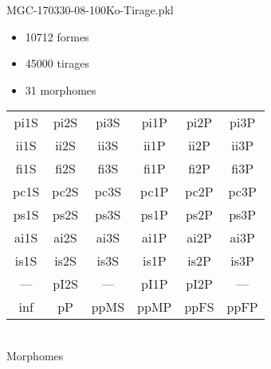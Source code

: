 MGC-170330-08-100Ko-Tirage.pkl
\begin{itemize}
\item 10712 formes
\item 45000 tirages
\item 31 morphomes
\end{itemize}
\begin{center}
\begin{tabular}{cccccc}
\hline
\cellcolor{white}pi1S & \cellcolor{orange}pi2S & \cellcolor{orange}pi3S & \cellcolor{white}pi1P & \cellcolor{white}pi2P & \cellcolor{white}pi3P\\
\cellcolor{brown}ii1S & \cellcolor{brown}ii2S & \cellcolor{brown}ii3S & \cellcolor{white}ii1P & \cellcolor{white}ii2P & \cellcolor{brown}ii3P\\
\cellcolor{yellow}fi1S & \cellcolor{lime}fi2S & \cellcolor{lime}fi3S & \cellcolor{green}fi1P & \cellcolor{white}fi2P & \cellcolor{green}fi3P\\
\cellcolor{yellow}pc1S & \cellcolor{yellow}pc2S & \cellcolor{yellow}pc3S & \cellcolor{white}pc1P & \cellcolor{white}pc2P & \cellcolor{yellow}pc3P\\
\cellcolor{white}ps1S & \cellcolor{teal}ps2S & \cellcolor{teal}ps3S & \cellcolor{white}ps1P & \cellcolor{white}ps2P & \cellcolor{teal}ps3P\\
\cellcolor{white}ai1S & \cellcolor{lightgray}ai2S & \cellcolor{lightgray}ai3S & \cellcolor{white}ai1P & \cellcolor{pink}ai2P & \cellcolor{white}ai3P\\
\cellcolor{black}is1S & \cellcolor{pink}is2S & \cellcolor{lightgray}is3S & \cellcolor{pink}is1P & \cellcolor{black}is2P & \cellcolor{pink}is3P\\
--- & \cellcolor{white}pI2S & --- & \cellcolor{white}pI1P & \cellcolor{white}pI2P & ---\\
\cellcolor{white}inf & \cellcolor{white}pP & \cellcolor{white}ppMS & \cellcolor{white}ppMP & \cellcolor{white}ppFS & \cellcolor{pink}ppFP\\
\hline
\end{tabular}\\
Morphomes
\end{center}
\bigskip

